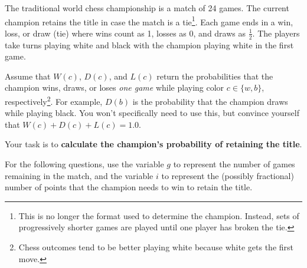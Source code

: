 \documentclass[12pt]{exam}
\newcommand{\stars}[1]{%
    \foreach \n in {1,...,#1}{%
        $\filledstar$%
    }%
}
\begin{document}
\pagebreak
\begin{questions}

    \question[55] [W9, \stars{5}] The traditional world chess championship is a match of 24 games. The current champion retains the title in case the match is a tie\footnote{This is no longer the format used to determine the champion. Instead, sets of progressively shorter games are played until one player has broken the tie.}. Each game ends in a win, loss, or draw (tie) where wins count as 1, losses as 0, and draws as $\frac{1}{2}$. The players take turns playing white and black with the champion playing white in the first game.

    Assume that $W(c)$, $D(c)$, and $L(c)$ return the probabilities that the champion wins, draws, or loses {\em one game} while playing color $c \in \{w, b\}$, respectively\footnote{Chess outcomes tend to be better playing white because white gets the first move.}. For example, $D(b)$ is the probability that the champion draws while playing black. You won't specifically need to use this, but convince yourself that $W(c) + D(c) + L(c) = 1.0$.

    Your task is to \textbf{calculate the champion's probability of retaining the title}.

    For the following questions, use the variable $g$ to represent the number of games remaining in the match, and the variable $i$ to represent the (possibly fractional) number of points that the champion needs to win to retain the title.

\end{questions}
\end{document}
